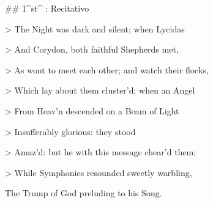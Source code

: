 ## 1^st^ \mvmt: Recitativo

\beginnumbering
\pstart
> The Night was dark and silent; when Lycidas \ledsidenote{Lycidas and Corydon are stock classical characters. [@}

> And Corydon, both faithful Shepherds met, 

> As wont to meet each other; and watch their flocks, 

> Which lay about them cluster’d: when an Angel 

> From Heav’n descended on a Beam of Light 

> Insufferably glorious: they stood 

> Amaz’d: but he with this message chear’d them; 

> While Symphonies resounded sweetly warbling, 

The Trump of God preluding to his Song.
\pend
\endnumbering
